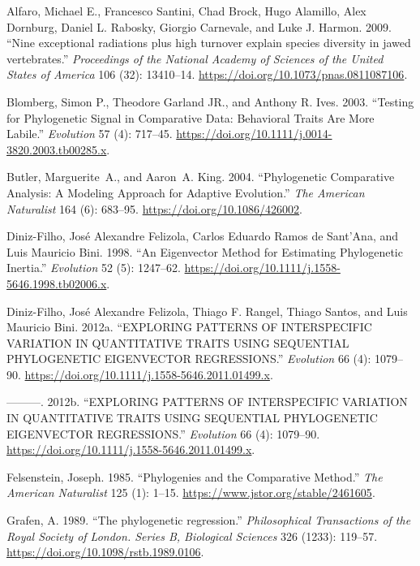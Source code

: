 \documentclass[
]{book}
\newlength{\cslhangindent}
\newenvironment{CSLReferences}[2] %
 {\begin{list}{}{%
  \setlength{\itemindent}{0pt}
  \setlength{\leftmargin}{0pt}
  \setlength{\parsep}{0pt}
  \ifodd #1
   \setlength{\leftmargin}{\cslhangindent}
   \setlength{\itemindent}{-1\cslhangindent}
  \fi
  \setlength{\itemsep}{#2\baselineskip}}}
 {\end{list}}
\begin{document}
\label{refs}
\begin{CSLReferences}{1}{0}
Alfaro, Michael E., Francesco Santini, Chad Brock, Hugo Alamillo, Alex Dornburg, Daniel L. Rabosky, Giorgio Carnevale, and Luke J. Harmon. 2009. {``Nine exceptional radiations plus high turnover explain species diversity in jawed vertebrates.''} \emph{Proceedings of the National Academy of Sciences of the United States of America} 106 (32): 13410--14. \url{https://doi.org/10.1073/pnas.0811087106}.

Blomberg, Simon P., Theodore Garland JR., and Anthony R. Ives. 2003. {``Testing for Phylogenetic Signal in Comparative Data: Behavioral Traits Are More Labile.''} \emph{Evolution} 57 (4): 717--45. \url{https://doi.org/10.1111/j.0014-3820.2003.tb00285.x}.

Butler, Marguerite~A., and Aaron~A. King. 2004. {``Phylogenetic Comparative Analysis: A Modeling Approach for Adaptive Evolution.''} \emph{The American Naturalist} 164 (6): 683--95. \url{https://doi.org/10.1086/426002}.

Diniz-Filho, José Alexandre Felizola, Carlos Eduardo Ramos de Sant'Ana, and Luis Mauricio Bini. 1998. {``An Eigenvector Method for Estimating Phylogenetic Inertia.''} \emph{Evolution} 52 (5): 1247--62. \url{https://doi.org/10.1111/j.1558-5646.1998.tb02006.x}.

Diniz-Filho, José Alexandre Felizola, Thiago F. Rangel, Thiago Santos, and Luis Mauricio Bini. 2012a. {``EXPLORING PATTERNS OF INTERSPECIFIC VARIATION IN QUANTITATIVE TRAITS USING SEQUENTIAL PHYLOGENETIC EIGENVECTOR REGRESSIONS.''} \emph{Evolution} 66 (4): 1079--90. \url{https://doi.org/10.1111/j.1558-5646.2011.01499.x}.

---------. 2012b. {``EXPLORING PATTERNS OF INTERSPECIFIC VARIATION IN QUANTITATIVE TRAITS USING SEQUENTIAL PHYLOGENETIC EIGENVECTOR REGRESSIONS.''} \emph{Evolution} 66 (4): 1079--90. \url{https://doi.org/10.1111/j.1558-5646.2011.01499.x}.

Felsenstein, Joseph. 1985. {``Phylogenies and the Comparative Method.''} \emph{The American Naturalist} 125 (1): 1--15. \url{https://www.jstor.org/stable/2461605}.

Grafen, A. 1989. {``The phylogenetic regression.''} \emph{Philosophical Transactions of the Royal Society of London. Series B, Biological Sciences} 326 (1233): 119--57. \url{https://doi.org/10.1098/rstb.1989.0106}.


\end{CSLReferences}
\end{document}
